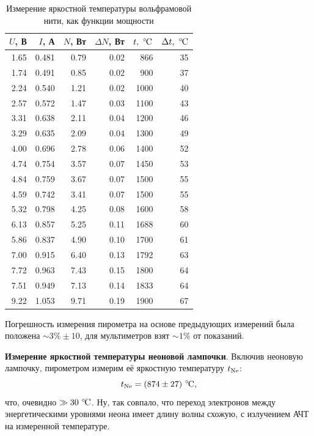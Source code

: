 \begin{table}[ht]
    \caption{Измерение яркостной температуры вольфрамовой нити, как функции мощности}
    \centering
    \begin{tabular}{rrrrrr}
    \toprule
       $U$, В &     $I$, А &    $N$, Вт &   $\Delta N$, Вт &    $t, \ ^\circ\hspace{-1pt}\textnormal{C}$ &  $\Delta t, \ ^\circ\hspace{-1pt}\textnormal{C}$ \\
    \midrule
    1.65 & 0.481 & 0.79 & 0.02 &  866 &  35 \\
    1.74 & 0.491 & 0.85 & 0.02 &  900 &  37 \\
    2.24 & 0.540 & 1.21 & 0.02 & 1000 &  40 \\
    2.57 & 0.572 & 1.47 & 0.03 & 1100 &  43 \\
    3.31 & 0.638 & 2.11 & 0.04 & 1200 &  46 \\
    3.29 & 0.635 & 2.09 & 0.04 & 1300 &  49 \\
    4.00 & 0.696 & 2.78 & 0.06 & 1400 &  52 \\
    4.74 & 0.754 & 3.57 & 0.07 & 1450 &  53 \\
    4.84 & 0.759 & 3.67 & 0.07 & 1500 &  55 \\
    4.59 & 0.742 & 3.41 & 0.07 & 1500 &  55 \\
    5.32 & 0.798 & 4.25 & 0.08 & 1600 &  58 \\
    6.13 & 0.857 & 5.25 & 0.11 & 1688 &  60 \\
    5.86 & 0.837 & 4.90 & 0.10 & 1700 &  61 \\
    7.00 & 0.915 & 6.40 & 0.13 & 1792 &  63 \\
    7.72 & 0.963 & 7.43 & 0.15 & 1800 &  64 \\
    7.51 & 0.949 & 7.13 & 0.14 & 1833 &  64 \\
    9.22 & 1.053 & 9.71 & 0.19 & 1900 &  67 \\
    \bottomrule
    \end{tabular}
\label{tab}
\end{table}


Погрешность измерения пирометра на основе предыдующих измерений была положена $\sim 3\% \pm 10$, для мультиметров взят $\sim 1\%$ от показаний.


\textbf{Измерение яркостной температуры неоновой лампочки}. Включив неоновую лампочку, пирометром измерим её яркостную температуру $t_{\textnormal{Ne}}$:
\begin{equation*}
    t_{\textnormal{Ne}} = (874 \pm 27) \ ^\circ\hspace{-1pt}\textnormal{C},
\end{equation*}
что, очевидно $\gg 30 \ ^\circ\hspace{-1pt}\textnormal{C}$. Ну, так совпало, что переход электронов между энергетическими уровнями неона имеет длину волны схожую, с излучением АЧТ на измеренной температуре. 